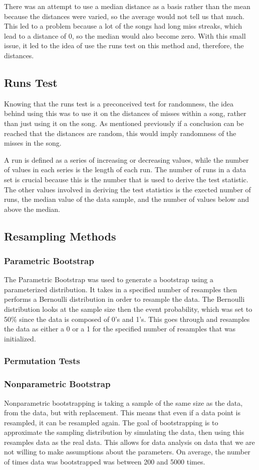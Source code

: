 \documentclass[12pt, letterpaper]{article}
\begin{document}
There was an attempt to use a median distance as a basis rather than the mean because the distances were varied, so the average would not tell us that much.  This led to a problem because a lot of the songs had long miss streaks, which lead to a distance of 0, so the median would also become zero.  With this small issue, it led to the idea of use the runs test on this method and, therefore, the distances.  

\subsection{Runs Test}
Knowing that the runs test is a preconceived test for randomness, the idea behind using this was to use it on the distances of misses within a song, rather than just using it on the song. As mentioned previously if a conclusion can be reached that the distances are random, this would imply randomness of the misses in the song. 

A run is defined as a series of increasing or decreasing values, while the number of values in each series is the length of each run. The number of runs in a data set is crucial because this is the number that is used to derive the test statistic. The other values involved in deriving the test statistics is the exected number of runs, the median value of the data sample, and the number of values below and above the median.

\subsection{Resampling Methods}
\subsubsection{Parametric Bootstrap}
The Parametric Bootstrap was used to generate a bootstrap using a parameterized distribution.  It takes in a specified number of resamples then performs a Bernoulli distribution in order to resample the data.  The Bernoulli distribution looks at the sample size then the event probability, which was set to 50\% since the data is composed of 0's and 1's.  This goes through and resamples the data as either a 0 or a 1 for the specified number of resamples that was initialized.   

\subsubsection{Permutation Tests}
\subsubsection{Nonparametric Bootstrap}
Nonparametric bootstrapping is taking a sample of the same size as the data, from the data, but with replacement. This means that even if a data point is resampled, it can be resampled again. The goal of bootstrapping is to approximate the sampling distribution by simulating the data, then using this resamples data as the real data. This allows for data analysis on data that we are not willing to make assumptions about the parameters. On average, the number of times data was bootstrapped was between 200 and 5000 times. 
\end{document}
